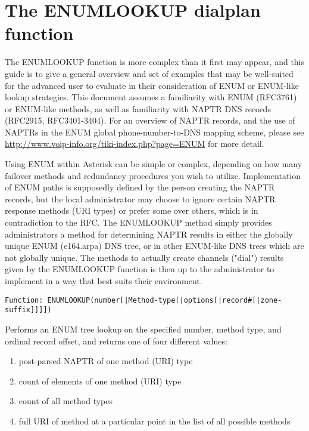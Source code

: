 \section{The ENUMLOOKUP dialplan function}

The ENUMLOOKUP function is more complex than it first may appear, and
this guide is to give a general overview and set of examples that may
be well-suited for the advanced user to evaluate in their
consideration of ENUM or ENUM-like lookup strategies.  This document
assumes a familiarity with ENUM (RFC3761) or ENUM-like methods, as
well as familiarity with NAPTR DNS records (RFC2915, RFC3401-3404).
For an overview of NAPTR records, and the use of NAPTRs in the ENUM
global phone-number-to-DNS mapping scheme, please see
\url{http://www.voip-info.org/tiki-index.php?page=ENUM} for more detail.

Using ENUM within Asterisk can be simple or complex, depending on how
many failover methods and redundancy procedures you wish to utilize.
Implementation of ENUM paths is supposedly defined by the person
creating the NAPTR records, but the local administrator may choose to
ignore certain NAPTR response methods (URI types) or prefer some over
others, which is in contradiction to the RFC.  The ENUMLOOKUP method
simply provides administrators a method for determining NAPTR results
in either the globally unique ENUM (e164.arpa) DNS tree, or in other
ENUM-like DNS trees which are not globally unique.  The methods to
actually create channels ("dial") results given by the ENUMLOOKUP
function is then up to the administrator to implement in a way that
best suits their environment.

\begin{verbatim}
Function: ENUMLOOKUP(number[|Method-type[|options[|record#[|zone-suffix]]]])
\end{verbatim}

  Performs an ENUM tree lookup on the specified number, method type, and
  ordinal record offset, and returns one of four different values:

\begin{enumerate}
   \item post-parsed NAPTR of one method (URI) type
   \item count of elements of one method (URI) type
   \item count of all method types
   \item full URI of method at a particular point in the list of all possible methods 
\end{enumerate}

